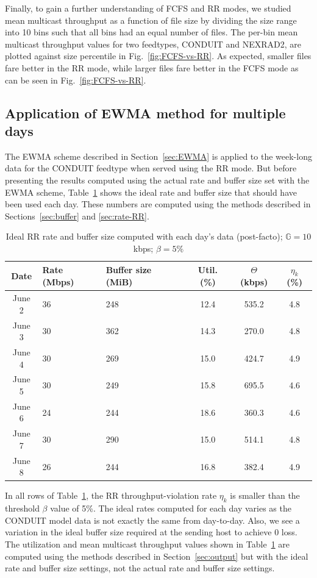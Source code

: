 Finally, to gain a further understanding of FCFS and RR modes, we studied mean multicast throughput as a function of file size by dividing the size range
into 10 bins such that all bins had an equal number
of files. The per-bin mean multicast throughput values
for two feedtypes, CONDUIT and NEXRAD2, are plotted against size
percentile in Fig.~\ref{fig:FCFS-vs-RR}. As expected, smaller files fare better
in the RR mode, while larger files fare better in the FCFS mode
as can be seen in Fig.~\ref{fig:FCFS-vs-RR}. 

\subsection{Application of EWMA method for multiple days}
\label{sec:EWMA-results}
The EWMA scheme described in Section~\ref{sec:EWMA} is applied
to the week-long data for the CONDUIT feedtype when served using the RR mode. But before presenting the results computed using the actual rate
and buffer size set with the EWMA scheme,
Table~\ref{tbl:ideal-week} shows the ideal rate and buffer
size that should have been used each day. These numbers
are computed using the methods described in Sections~\ref{sec:buffer} and \ref{sec:rate-RR}.
\begin{table}[ht]
\caption{Ideal RR rate and buffer size computed with each day's data (post-facto); $\mathbb{G}=10$ kbps; $\beta=5\%$}
\centering
\begin{tabular}{| c | p{0.4in} | p{0.3in} | c | c| c |} \hline
Date & Rate (Mbps) & Buffer size (MiB) & Util. (\%) &  $\Theta$ (kbps) & $\eta_k$ (\%)\\ \hline
June 2 & 36 &248 & 12.4 & 535.2 &4.8 \\ \hline
June 3 & 30 & 362 & 14.3 &270.0 &4.8 \\ \hline
June 4 & 30&269 &15.0 & 424.7 & 4.9 \\ \hline
June 5 &30 & 249 &15.8 &695.5 &4.6 \\ \hline
June 6 &24 & 244 &18.6 &360.3 &4.6 \\ \hline
June 7 & 30 & 290 & 15.0 &514.1 & 4.8 \\ \hline
June 8 & 26 & 244& 16.8 &382.4 & 4.9 \\ \hline
\end{tabular}

\label{tbl:ideal-week}
\end{table}
In all rows of Table~\ref{tbl:ideal-week}, the RR throughput-violation rate
$\eta_k$ is smaller than the threshold $\beta$ value of 5\%.
The ideal rates computed for each day varies as the CONDUIT
model data is not exactly the same from day-to-day. Also, we see
a variation in the ideal buffer size required at the sending host
to achieve 0 loss. The utilization and mean multicast throughput values shown
in Table~\ref{tbl:ideal-week} are computed using the methods
described in Section~\ref{sec:output} but with the ideal rate and buffer
size settings, not the actual rate and buffer size settings.

